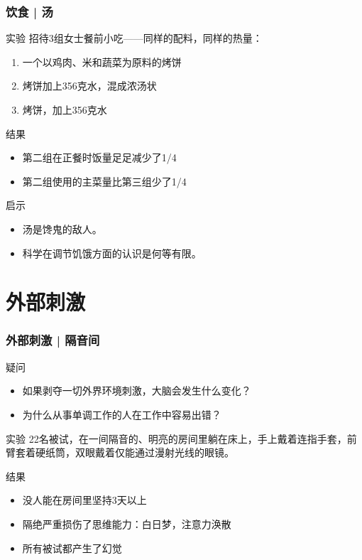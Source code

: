 \begin{frame}
  \frametitle{饮食 | 汤}
  \begin{block}{实验}
    招待3组女士餐前小吃——同样的配料，同样的热量：
    \begin{enumerate}
      \item 一个以鸡肉、米和蔬菜为原料的烤饼
      \item 烤饼加上356克水，混成浓汤状
      \item 烤饼，加上356克水
    \end{enumerate}
  \end{block}
  \pause
  \begin{block}{结果}
    \begin{itemize}
      \item 第二组在正餐时饭量足足减少了1/4
      \item 第二组使用的主菜量比第三组少了1/4
    \end{itemize}
  \end{block}
  \pause
  \begin{block}{启示}
    \begin{itemize}
      \item 汤是馋鬼的敌人。
      \item 科学在调节饥饿方面的认识是何等有限。
    \end{itemize}
  \end{block}
\end{frame}

\section{外部刺激}
\begin{frame}
  \frametitle{外部刺激 | 隔音间}
  \begin{block}{疑问}
    \begin{itemize}
      \item 如果剥夺一切外界环境刺激，大脑会发生什么变化？
      \item 为什么从事单调工作的人在工作中容易出错？
    \end{itemize}
  \end{block}
  \pause
  \begin{block}{实验}
22名被试，在一间隔音的、明亮的房间里躺在床上，手上戴着连指手套，前臂套着硬纸筒，双眼戴着仅能通过漫射光线的眼镜。
  \end{block}
  \pause
  \begin{block}{结果}
    \begin{itemize}
      \item 没人能在房间里坚持3天以上
      \item 隔绝严重损伤了思维能力：白日梦，注意力涣散
      \item 所有被试都产生了幻觉
    \end{itemize}
  \end{block}
\end{frame}

